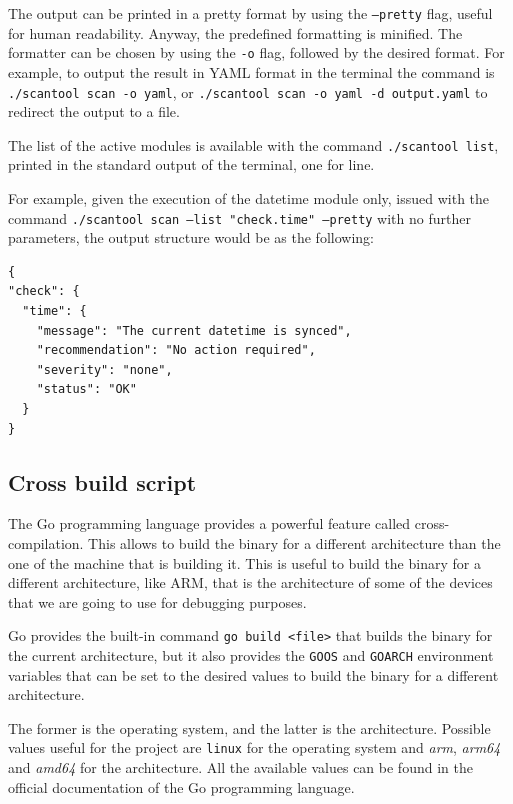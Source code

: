 The output can be printed in a pretty format by using the \texttt{--pretty} flag, useful for human readability. Anyway, the predefined formatting is minified. The formatter can be chosen by using the \texttt{-o} flag, followed by the desired format. For example, to output the result in YAML format in the terminal the command is \texttt{./scantool scan -o yaml}, or \texttt{./scantool scan -o yaml -d output.yaml} to redirect the output to a file.

The list of the active modules is available with the command \texttt{./scantool list}, printed in the standard output of the terminal, one for line.

For example, given the execution of the datetime module only, issued with the command \texttt{./scantool scan --list "check.time" --pretty} with no further parameters, the output structure would be as the following:

\begin{lstlisting}[style=json, caption={Output of the datetime module}]
{
"check": {
  "time": {
    "message": "The current datetime is synced",
    "recommendation": "No action required",
    "severity": "none",
    "status": "OK"
  }
}
\end{lstlisting}

\subsection{Cross build script}

The Go programming language provides a powerful feature called cross-compilation. This allows to build the binary for a different architecture than the one of the machine that is building it. This is useful to build the binary for a different architecture, like ARM, that is the architecture of some of the devices that we are going to use for debugging purposes.

Go provides the built-in command \texttt{go build <file>} that builds the binary for the current architecture, but it also provides the \texttt{GOOS} and \texttt{GOARCH} environment variables that can be set to the desired values to build the binary for a different architecture.

The former is the operating system, and the latter is the architecture. Possible values useful for the project are \texttt{linux} for the operating system and \textit{arm}, \textit{arm64} and \textit{amd64} for the architecture. All the available values can be found in the official documentation of the Go programming language.~\cite{go-valid-goos-goarch-combinations}

